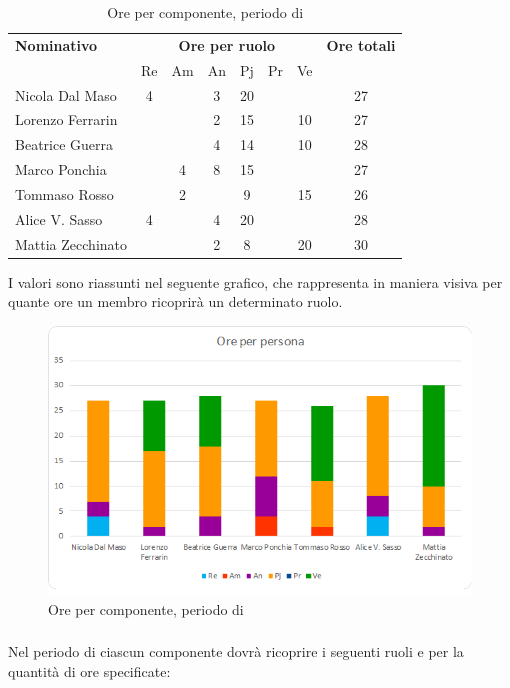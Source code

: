 \begin{table}[H]
	\centering
	\begin{tabular}{|l|c|c|c|c|c|c|c|}
		\hline
		\textbf{Nominativo} & 
		\multicolumn{6}{c|}{\textbf{Ore per ruolo}} & 
		\textbf{Ore totali} \\
		& Re & Am & An & Pj & Pr & Ve & \\
		\hline
		Nicola Dal Maso &4 & &3 &20 & & & 27 \\
		Lorenzo Ferrarin & & &2 &15 & &10 & 27 \\
		Beatrice Guerra & & &4 &14 & &10 & 28 \\
		Marco Ponchia & &4 &8 &15 & & & 27 \\
		Tommaso Rosso & &2 & &9 & &15 & 26 \\
		Alice V. Sasso &4 & &4 &20 & & & 28 \\
		Mattia Zecchinato & & &2 &8 & &20 & 30 \\
		\hline
	\end{tabular}
	\caption{Ore per componente, periodo di \PA{}}
\end{table}
I valori sono riassunti nel seguente grafico, che rappresenta in maniera visiva per quante ore un membro ricoprirà un determinato ruolo.
\begin{figure}[H]
	\centering
	\includegraphics[width=14cm]{img_suddlavoro/PA.png}
	\caption{Ore per componente, periodo di \PA{}}
\end{figure}

\subsubsection{\PD}
Nel periodo di \PD{} ciascun componente dovrà ricoprire i seguenti ruoli e per la quantità di ore specificate:

